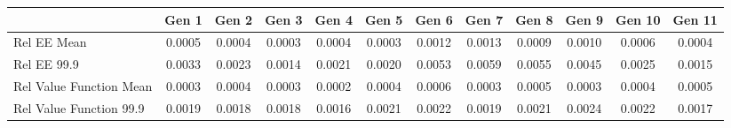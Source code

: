 
\begin{tabular}{@{}lccccccccccc@{}}
\hline
\hline
& Gen 1 & Gen 2 & Gen 3 & Gen 4 & Gen 5 & Gen 6 & Gen 7 & Gen 8 & Gen 9 & Gen 10 & Gen 11 \\
\hline
Rel EE Mean          & 0.0005 & 0.0004 & 0.0003 & 0.0004 & 0.0003 & 0.0012 & 0.0013 & 0.0009 & 0.0010 & 0.0006 & 0.0004 \\
Rel EE 99.9     & 0.0033 & 0.0023 & 0.0014 & 0.0021 & 0.0020 & 0.0053 & 0.0059 & 0.0055 & 0.0045 & 0.0025 & 0.0015 \\
Rel Value Function Mean       & 0.0003 & 0.0004 & 0.0003 & 0.0002 & 0.0004 & 0.0006 & 0.0003 & 0.0005 & 0.0003 & 0.0004 & 0.0005 \\
Rel Value Function 99.9  & 0.0019 & 0.0018 & 0.0018 & 0.0016 & 0.0021 & 0.0022 & 0.0019 & 0.0021 & 0.0024 & 0.0022 & 0.0017 \\
\bottomrule
\end{tabular}